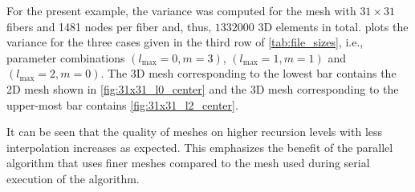 For the present example, the variance was computed for the mesh with $31 \times 31$ fibers and \num{1481} nodes per fiber and, thus, $\num{1332000}$ 3D elements in total.
 plots the variance for the three cases given in the third row of \cref{tab:file_sizes}, i.e., parameter combinations $(l_\text{max}=0,m=3)$, $(l_\text{max}=1,m=1)$ and $(l_\text{max}=2,m=0)$. The 3D mesh corresponding to the lowest bar contains the 2D mesh shown in \cref{fig:31x31_l0_center} and the 3D mesh corresponding to the upper-most bar contains \cref{fig:31x31_l2_center}. 

It can be seen that the quality of meshes on higher recursion levels with less interpolation increases as expected.
This emphasizes the benefit of the parallel algorithm that uses finer meshes compared to the mesh used during serial execution of the algorithm.

